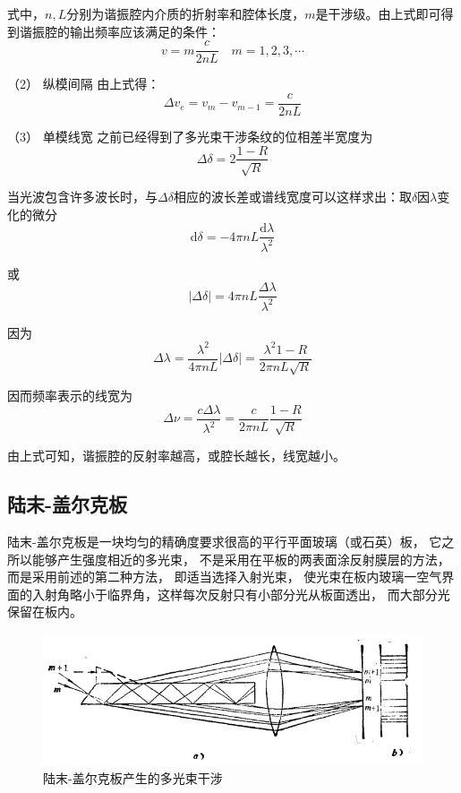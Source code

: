 \documentclass[UTF8]{ctexart}
\begin{document}
\noindent 式中，$ n,L $分别为谐振腔内介质的折射率和腔体长度，$ m $是干涉级。由上式即可得到谐振腔的输出频率应该满足的条件：
\begin{equation}
	v= m \frac{c}{2 n L} \quad m=1,2,3,\cdots
\end{equation}

	（2） 纵模间隔
	由上式得：
	\begin{equation}
		\Delta v_{e} = v_{m} - v_{m-1} = \frac{c}{2 n L}
	\end{equation}
	
	（3） 单模线宽
	之前已经得到了多光束干涉条纹的位相差半宽度为
	\begin{equation}
		\Delta \delta = 2\frac{1-R}{\sqrt{R}}
	\end{equation}
	
\noindent 当光波包含许多波长时，与$ \Delta \delta $相应的波长差或谱线宽度可以这样求出：取$ \delta $因$ \lambda $变化的微分
\begin{equation}
\mathrm{d} \delta=-4 \pi n L \frac{\mathrm{d} \lambda}{\lambda^{2}}
\end{equation}

\noindent 或
\begin{equation}
|\Delta \delta|=4 \pi n L \frac{\Delta \lambda}{\lambda^{2}}
\end{equation}

\noindent 因为
\begin{equation}
\Delta \lambda=\frac{\lambda^{2}}{4 \pi n L}|\Delta \delta|=\frac{\lambda^{2} 1-R}{2 \pi n L \sqrt{R}}
\end{equation}

\noindent 因而频率表示的线宽为
\begin{equation}
\Delta \nu=\frac{c \Delta \lambda}{\lambda^{2}}=\frac{c}{2 \pi n L} \frac{1-R}{\sqrt{R}}
\end{equation}

\noindent 由上式可知，谐振腔的反射率越高，或腔长越长，线宽越小。

	\subsection{陆末-盖尔克板}
	陆末-盖尔克板是一块均匀的精确度要求很高的平行平面玻璃（或石英）板， 它之所以能够产生强度相近的多光束， 不是采用在平板的两表面涂反射膜层的方法， 而是采用前述的第二种方法， 即适当选择入射光束， 使光束在板内玻璃一空气界面的入射角略小于临界角，这样每次反射只有小部分光从板面透出， 而大部分光保留在板内。
	
	\begin{figure}[H]
		\centering
		\includegraphics[width=12cm]{Interference_gaierke.png}
		\caption{陆末-盖尔克板产生的多光束干涉}
	\end{figure}
\end{document}

